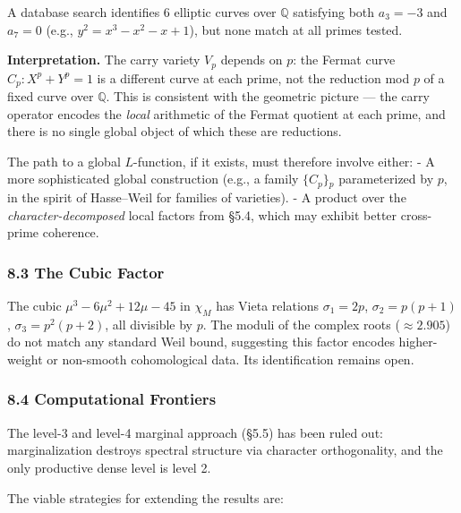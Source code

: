 \documentclass[
  11pt,
]{article}
\begin{document}
A database search identifies 6 elliptic curves over \(\mathbb{Q}\) satisfying
both \(a_3 = -3\) and \(a_7 = 0\) (e.g., \(y^2 = x^3 - x^2 - x + 1\)), but none
match at all primes tested.

\textbf{Interpretation.} The carry variety \(V_p\) depends on \(p\): the Fermat
curve \(C_p: X^p + Y^p = 1\) is a different curve at each prime, not the
reduction mod \(p\) of a fixed curve over \(\mathbb{Q}\). This is consistent
with the geometric picture --- the carry operator encodes the \emph{local}
arithmetic of the Fermat quotient at each prime, and there is no single global
object of which these are reductions.

The path to a global \(L\)-function, if it exists, must therefore involve
either: - A more sophisticated global construction (e.g., a family
\(\lbrace{}C_p\rbrace{}_p\) parameterized by \(p\), in the spirit of Hasse--Weil
for families of varieties). - A product over the \emph{character-decomposed}
local factors from §5.4, which may exhibit better cross-prime coherence.

\subsubsection{8.3 The Cubic Factor}\label{the-cubic-factor}

The cubic \(\mu^3 - 6\mu^2 + 12\mu - 45\) in \(\chi_M\) has Vieta relations
\(\sigma_1 = 2p\), \(\sigma_2 = p(p+1)\), \(\sigma_3 = p^2(p+2)\), all divisible
by \(p\). The moduli of the complex roots (\(\approx 2.905\)) do not match any
standard Weil bound, suggesting this factor encodes higher-weight or non-smooth
cohomological data. Its identification remains open.

\subsubsection{8.4 Computational Frontiers}\label{computational-frontiers}

The level-3 and level-4 marginal approach (§5.5) has been ruled out:
marginalization destroys spectral structure via character orthogonality, and the
only productive dense level is level 2.

The viable strategies for extending the results are:
\end{document}
